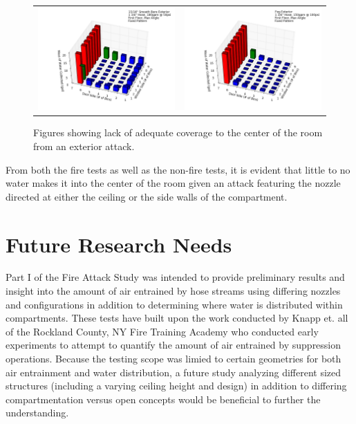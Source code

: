 \documentclass{article}
\begin{document}
\begin{figure}[ht]
\begin{tabular*}{\textwidth}{lr}
\includegraphics[width=3.2in]{../ADD_Analysis/Figures/15-12-08_101028_Datafile_15_16in_Smooth_Bore_Exterior.png} &
\includegraphics[width=3.2in]{../ADD_Analysis/Figures/15-12-08_121806_Datafile_Fog_Exterior.png} \\
\end{tabular*}
\caption{Figures showing lack of adequate coverage to the center of the room from an exterior attack.}
\label{fig:Lack_of_Center_Coverage_Exterior}
\end{figure}

From both the fire tests as well as the non-fire tests, it is evident that little to no water makes it into the center of the room given an attack featuring the nozzle directed at either the ceiling or the side walls of the compartment.

\vspace*{\baselineskip}

\clearpage

\section{Future Research Needs}

Part I of the Fire Attack Study was intended to provide preliminary results and insight into the amount of air entrained by hose streams using differing nozzles and configurations in addition to determining where water is distributed within compartments. These tests have built upon the work conducted by Knapp et. all of the Rockland County, NY Fire Training Academy who conducted early experiments to attempt to quantify the amount of air entrained by suppression operations. Because the testing scope was limied to certain geometries for both air entrainment and water distribution, a future study analyzing different sized structures (including a varying ceiling height and design) in addition to differing compartmentation versus open concepts would be beneficial to further the understanding.
\end{document}

